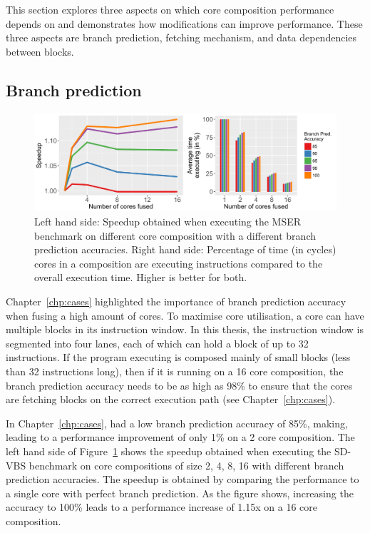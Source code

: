 This section explores three aspects on which core composition performance depends on and demonstrates how modifications can improve performance.
These three aspects are branch prediction, fetching mechanism, and data dependencies between blocks.

\subsection{Branch prediction}
\begin{figure}[t]
    \centering
    \includegraphics[width=1\textwidth]{chapter3/graphics/motiv_p1.pdf}
    \caption{Left hand side: Speedup obtained when executing the MSER benchmark on different core composition with a different branch prediction accuracies.
	Right hand side: Percentage of time (in cycles) cores in a composition are executing instructions compared to the overall execution time. Higher is better for both.}
    \label{fig:mser_motiv}
	\vspace{1em}
\end{figure}
Chapter~\ref{chp:cases} highlighted the importance of branch prediction accuracy when fusing a high amount of cores.
To maximise core utilisation, a core can have multiple blocks in its instruction window.
In this thesis, the instruction window is segmented into four lanes, each of which can hold a block of up to 32 instructions.
If the program executing is composed mainly of small blocks (less than 32 instructions long), then if it is running on a 16 core composition, the branch prediction accuracy needs to be as high as 98\% to ensure that the cores are fetching blocks on the correct execution path (see Chapter~\ref{chp:cases}).

In Chapter~\ref{chp:cases},  had a low branch prediction accuracy of 85\%, making, leading to a performance improvement of only 1\% on a 2 core composition.
The left hand side of Figure~\ref{fig:mser_motiv} shows the speedup obtained when executing the SD-VBS benchmark  on core compositions of size 2, 4, 8, 16 with different branch prediction accuracies.
The speedup is obtained by comparing the performance to a single core with perfect branch prediction.
As the figure shows, increasing the accuracy to 100\% leads to a performance increase of 1.15x on a 16 core composition.
